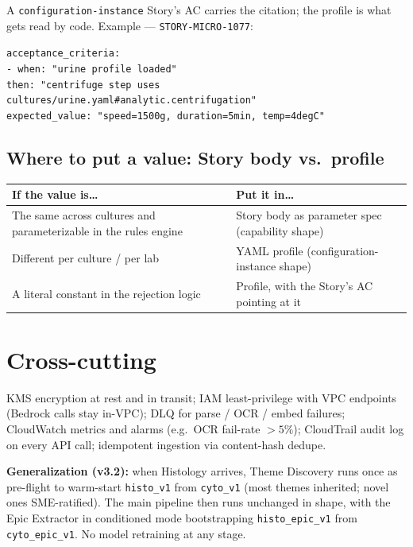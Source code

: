 \documentclass[10pt,letterpaper]{article}
\begin{document}
A \texttt{configuration-instance} Story's AC carries the citation; the profile is what gets read by code. Example --- \texttt{STORY-MICRO-1077}:

\noindent\texttt{\scriptsize acceptance\_criteria:\\
\hspace*{1em}- when: "urine profile loaded"\\
\hspace*{2em}then: "centrifuge step uses cultures/urine.yaml\#analytic.centrifugation"\\
\hspace*{2em}expected\_value: "speed=1500g, duration=5min, temp=4degC"}

\subsection{Where to put a value: Story body vs.\ profile}

\begin{tabularx}{\textwidth}{@{}p{6.5cm}X@{}}
\toprule
\textbf{If the value is\ldots} & \textbf{Put it in\ldots} \\
\midrule
The same across cultures and parameterizable in the rules engine & Story body as parameter spec (capability shape) \\
Different per culture / per lab & YAML profile (configuration-instance shape) \\
A literal constant in the rejection logic & Profile, with the Story's AC pointing at it \\
\bottomrule
\end{tabularx}

\section{Cross-cutting}

KMS encryption at rest and in transit; IAM least-privilege with VPC endpoints (Bedrock calls stay in-VPC); DLQ for parse / OCR / embed failures; CloudWatch metrics and alarms (e.g.\ OCR fail-rate $> 5\%$); CloudTrail audit log on every API call; idempotent ingestion via content-hash dedupe.

\textbf{Generalization (v3.2):} when Histology arrives, Theme Discovery runs once as pre-flight to warm-start \texttt{histo\_v1} from \texttt{cyto\_v1} (most themes inherited; novel ones SME-ratified). The main pipeline then runs unchanged in shape, with the Epic Extractor in conditioned mode bootstrapping \texttt{histo\_epic\_v1} from \texttt{cyto\_epic\_v1}. No model retraining at any stage.
\end{document}
